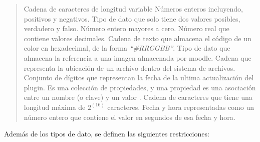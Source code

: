     \begin{quote}
    \begin{bGlosario}
         Cadena de caracteres de longitud variable
                 Números enteros incluyendo, positivos y negativos.
         Tipo de dato que solo tiene dos valores posibles,
                                  verdadero y falso.
         Número entero mayores a cero.
           Número real que contiene valores decimales.
             Cadena de texto que almacena el código de un color en hexadecimal,
                                  de la forma {\it ``\#RRGGBB''}.
            Tipo de dato que almacena la referencia a una imagen almacenada por
                                  moodle.
               Cadena que representa la ubicación de un archivo dentro del sistema
                                  de archivos.
         Conjunto de dígitos que representan la fecha de la ultima
                                  actualización del plugin.
          Es una colección de propiedades, y una propiedad es una
                                  asociación entre un nombre (o clave) y un valor
                                  \cite{ObjectMozilla}.
              Cadena de caracteres que tiene una longitud máxima de $2^{(16)}$ caracteres.
             Fecha y hora representadas como un número entero que contiene el valor en segundos de esa fecha y hora.
    \end{bGlosario}
    \end{quote}

 Además de los tipos de dato, se definen las
 siguientes restricciones:

